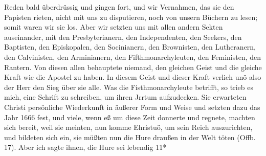 Reden bald überdrüssig und gingen fort, und wir Vernahmen,
das sie den Papisten rieten, nicht mit uns zu disputieren, noch
von unsern Büchern zu lesen; somit waren wir sie los. Aber
wir setzten uns mit allen andern Sekten auseinander, mit den
Presbyterianern, 
den Independenten, 
den Seekers, 
den Baptisten,
den Episkopalen, 
den Socinianern, 
den Brownisten, 
den Lutheranern,
den Calvinisten, 
den Arminianern, 
den Fifthmonarchyleuten, 
den Feministen, 
den Rantern. 
Von diesen allen behauptete niemand,
den gleichen Geist und die gleiche Kraft wie die Apostel zu haben.
In diesem Geist und dieser Kraft verlieh unö also der Herr den
Sieg über sie alle. Was die Fisthmonarchyleute betrifft, so trieb
es mich, eine Schrift zu schreiben, um ihren Jrrtum aufzudecken.
Sie erwarteten Christi persönliche Wiederkunft in äußerer Form
und Weise und setzten dazu das Jahr 1666 fest, und viele, wenn
eß um diese Zeit donnerte und regnete, machten sich bereit, weil
sie meinten, nun komme Ehristuö, um sein Reich auszurichten,
und bildeten sich ein, sie müßten nun die Hure draußen in der
Welt töten (Offb. 17). Aber ich sagte ihnen, die Hure sei lebendig
11*




